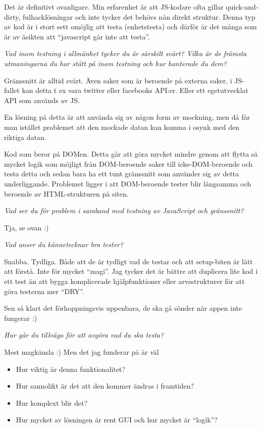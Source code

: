 \documentclass[11pt]{article}
\begin{document}
Det är definitivt ovanligare. Min erfarenhet är att JS-kodare ofta gillar
quick-and-dirty, fulhacklösningar och inte tycker det behövs nån direkt
struktur. Denna typ av kod är i stort sett omöjlig att testa (enhetstesta)
och därför är det många som är av åsikten att ``javascript går inte att
testa''.

\emph{Vad inom testning i allmänhet tycker du är särskilt svårt? Vilka är de
främsta utmaningarna du har stått på inom testning och hur hanterade du
dem?}

Gränssnitt är alltid svårt. Även saker som är beroende på externa saker, i
JS-fallet kan detta t ex vara twitter eller facebooks API:er. Eller ett
egetutvecklat API som används av JS.

En lösning på detta är att använda sig av någon form av mockning, men då
får man istället problemet att den mockade datan kan komma i osynk med den
riktiga datan.

Kod som beror på DOMen. Detta går att göra mycket mindre genom att flytta
så mycket logik som möjligt från DOM-beroende saker till icke-DOM-beroende
och testa detta och sedan bara ha ett tunt gränssnitt som använder sig av
detta underliggande. Problemet ligger i att DOM-beroende tester blir
långsamma och beroende av HTML-strukturen på siten.

\emph{Vad ser du för problem i samband med testning av JavaScript och
gränssnitt?}

Tja, se ovan :)

\emph{Vad anser du kännetecknar bra tester?}

Snabba. Tydliga. Både att de är tydligt vad de testar och att setup-biten
är lätt att förstå. Inte för mycket ``magi''. Jag tycker det är bättre att
duplicera lite kod i ett test än att bygga komplicerade hjälpfunktioner
eller arvsstrukturer för att göra testerna mer ``DRY''.

Sen så klart det förhoppningsvis uppenbara, de ska gå sönder när appen
inte fungerar :)

\emph{Hur går du tillväga för att avgöra vad du ska testa?}

Mest magkänsla :) Men det jag funderar på är väl

\begin{itemize}
\item Hur viktig är denna funktionalitet?
\item Hur sannolikt är det att den kommer ändras i framtiden?
\item Hur komplext blir det?
\item Hur mycket av lösningen är rent GUI och hur mycket är ``logik''?
\end{itemize}
\end{document}
